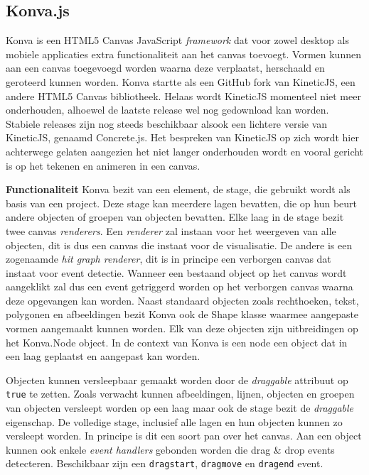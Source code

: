 \subsection{Konva.js} 
Konva is een HTML5 Canvas JavaScript \textit{framework} dat voor zowel desktop als mobiele applicaties extra functionaliteit aan het canvas toevoegt. Vormen kunnen aan een canvas toegevoegd worden waarna deze verplaatst, herschaald en geroteerd kunnen worden. Konva startte als een GitHub fork van KineticJS, een andere HTML5 Canvas bibliotheek. Helaas wordt KineticJS momenteel niet meer onderhouden, alhoewel de laatste release wel nog gedownload kan worden. Stabiele releases zijn nog steeds beschikbaar alsook een lichtere versie van KineticJS, genaamd Concrete.js. Het bespreken van KineticJS op zich wordt hier achterwege gelaten aangezien het niet langer onderhouden wordt en vooral gericht is op het tekenen en animeren in een canvas.

\textbf{Functionaliteit} \break
Konva bezit van een element, de stage, die gebruikt wordt als basis van een project. Deze stage kan meerdere lagen bevatten, die op hun beurt andere objecten of groepen van objecten bevatten. Elke laag in de stage bezit twee canvas \textit{renderers}. Een \textit{renderer} zal instaan voor het weergeven van alle objecten, dit is dus een canvas die instaat voor de visualisatie. De andere is een zogenaamde \textit{hit graph renderer}, dit is in principe een verborgen canvas dat instaat voor event detectie. Wanneer een bestaand object op het canvas wordt aangeklikt zal dus een event getriggerd worden op het verborgen canvas waarna deze opgevangen kan worden. Naast standaard objecten zoals rechthoeken, tekst, polygonen en afbeeldingen bezit Konva ook de Shape klasse waarmee aangepaste vormen aangemaakt kunnen worden. Elk van deze objecten zijn uitbreidingen op het Konva.Node object. In de context van Konva is een node een object dat in een laag geplaatst en aangepast kan worden. 

Objecten kunnen versleepbaar gemaakt worden door de \textit{draggable} attribuut op \lstinline{true} te zetten. Zoals verwacht kunnen afbeeldingen, lijnen, objecten en groepen van objecten versleept worden op een laag maar ook de stage bezit de \textit{draggable} eigenschap. De volledige stage, inclusief alle lagen en hun objecten kunnen zo versleept worden. In principe is dit een soort pan over het canvas. Aan een object kunnen ook enkele \textit{event handlers} gebonden worden die drag \& drop events detecteren. Beschikbaar zijn een \lstinline{dragstart}, \lstinline{dragmove} en \lstinline{dragend} event. 

